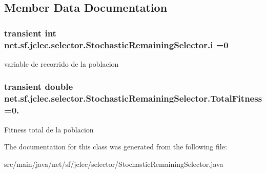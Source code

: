\subsection{Member Data Documentation}
\hypertarget{classnet_1_1sf_1_1jclec_1_1selector_1_1_stochastic_remaining_selector_ab2a1af3f6c09d075bb8795f8e5fa42d1}{
\subsubsection[{i}]{\setlength{\rightskip}{0pt plus 5cm}transient int net.\-sf.\-jclec.\-selector.\-Stochastic\-Remaining\-Selector.\-i =0\hspace{0.3cm}{\ttfamily [protected]}}}\label{classnet_1_1sf_1_1jclec_1_1selector_1_1_stochastic_remaining_selector_ab2a1af3f6c09d075bb8795f8e5fa42d1}
variable de recorrido de la poblacion \hypertarget{classnet_1_1sf_1_1jclec_1_1selector_1_1_stochastic_remaining_selector_a7ea1d65cd528ca92497a80841c9091e8}{
\subsubsection[{Total\-Fitness}]{\setlength{\rightskip}{0pt plus 5cm}transient double net.\-sf.\-jclec.\-selector.\-Stochastic\-Remaining\-Selector.\-Total\-Fitness =0.\hspace{0.3cm}{\ttfamily [protected]}}}\label{classnet_1_1sf_1_1jclec_1_1selector_1_1_stochastic_remaining_selector_a7ea1d65cd528ca92497a80841c9091e8}
Fitness total de la poblacion 

The documentation for this class was generated from the following file\-:\begin{DoxyCompactItemize}
\item 
src/main/java/net/sf/jclec/selector/Stochastic\-Remaining\-Selector.\-java\end{DoxyCompactItemize}
